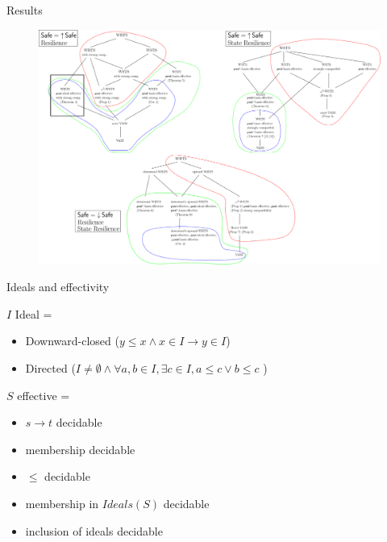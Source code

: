 \documentclass{beamer}
\begin{document}
  \begin{frame}{Results}
 
   \begin{center}
 	\begin{figure}
 	\vspace{-0.25cm}
\includegraphics[width=1.00\textwidth]{resultA}
	\end{figure}
\end{center}  

  \end{frame}
  \begin{frame}{Ideals and effectivity}
  

$I$ Ideal =
\begin{itemize}
 \item Downward-closed %
 ($y \leq x  \wedge x \in I \to y \in I$) 
 \item Directed %
 ($I \neq \emptyset \wedge \forall a,b \in I, \exists c \in I, a \leq c \vee b \leq c$ )
\end{itemize} 

  
\hspace{-2cm}

$S$ effective = 
 \begin{itemize}
\item $s \to t$ decidable 
\item membership decidable 
\item $\leq$ decidable 
\item membership in $Ideals(S)$ decidable 
\item inclusion of ideals decidable
\end{itemize}



  \end{frame}
\end{document}
